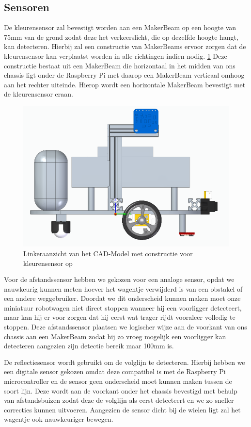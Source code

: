 \documentclass[a4paper,kulak]{kulakarticle}
\begin{document}
\subsection{Sensoren}
De kleurensensor zal bevestigt worden aan een MakerBeam op een hoogte van 75mm van de grond zodat deze het verkeerslicht, die op dezelfde hoogte hangt, kan detecteren. Hierbij zal een constructie van MakerBeams ervoor zorgen dat de kleurensensor kan verplaatst worden in alle richtingen indien nodig. \ref{fig:Linksaanzicht} Deze constructie bestaat uit een MakerBeam die horizontaal in het midden van ons chassis ligt onder de Raspberry Pi met daarop een MakerBeam verticaal omhoog aan het rechter uiteinde. Hierop wordt een  horizontale MakerBeam bevestigt met de kleurensensor eraan.
\begin{figure}[h]
	\centering
	\includegraphics[width=.5\textwidth] {rechterkant}
	\caption{Linkeraanzicht van het CAD-Model met constructie voor kleurensensor op}
	\label{fig:Linksaanzicht}
\end{figure}

Voor de afstandssensor hebben we gekozen voor een analoge sensor, opdat we nauwkeurig kunnen meten hoever het wagentje verwijderd is van een obstakel of een andere weggebruiker. Doordat we dit onderscheid kunnen maken moet onze miniatuur robotwagen niet direct stoppen wanneer hij een voorligger detecteert, maar kan hij er voor  zorgen dat hij eerst wat trager rijdt vooraleer volledig te stoppen. Deze afstandssensor plaatsen we logischer wijze aan de voorkant van ons chassis aan een MakerBeam zodat hij zo vroeg mogelijk een voorligger kan detecteren aangezien zijn detectie bereik maar 100mm is. 

De reflectiesensor wordt gebruikt om de volglijn te detecteren. Hierbij hebben we een digitale sensor gekozen omdat deze compatibel is met de Raspberry Pi microcontroller en de sensor geen onderscheid moet kunnen maken tussen de soort lijn. Deze wordt aan de voorkant onder het chassis bevestigd met behulp van afstandsbuizen zodat deze de volglijn als eerst detecteert en we zo sneller correcties kunnen uitvoeren. Aangezien de sensor dicht bij de wielen ligt zal het wagentje ook nauwkeuriger bewegen.
\end{document}
